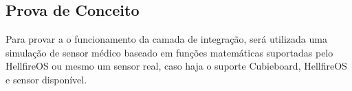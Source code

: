 \subsection{Prova de Conceito}
Para provar a o funcionamento da camada de integração, será utilizada uma
simulação de sensor médico baseado em funções matemáticas suportadas pelo HellfireOS
ou mesmo um sensor real, caso haja o suporte Cubieboard, HellfireOS e sensor disponível.

